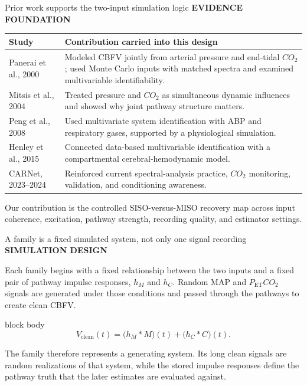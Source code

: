 \documentclass[aspectratio=169,11pt]{beamer}
\newcommand{\PETCOtwo}{P_{\mathrm{ET}}CO_2}
\newcommand{\sectionlabel}[1]{%
  {\color{Accent}\fontsize{8}{9.5}\selectfont\bfseries\MakeUppercase{#1}}\par\vspace{0.12cm}}
\newenvironment{equationcallout}
  {\begin{beamercolorbox}[rounded=true,sep=0.28cm,center,wd=0.94\textwidth]{block body}%
   \setbeamercolor{block body}{bg=AccentLight,fg=Ink}\large}
  {\end{beamercolorbox}}
\begin{document}
\begin{frame}{Prior work supports the two-input simulation logic}
\sectionlabel{Evidence Foundation}
\fontsize{9.4}{11.7}\selectfont
\begin{tabular}{p{}p{}}
\toprule
\textbf{Study} & \textbf{Contribution carried into this design}\\
\midrule
Panerai et al., 2000 & Modeled CBFV jointly from arterial pressure and end-tidal $CO_2$; used Monte Carlo inputs with matched spectra and examined multivariable identifiability.\\[0.08cm]
Mitsis et al., 2004 & Treated pressure and $CO_2$ as simultaneous dynamic influences and showed why joint pathway structure matters.\\[0.08cm]
Peng et al., 2008 & Used multivariate system identification with ABP and respiratory gases, supported by a physiological simulation.\\[0.08cm]
Henley et al., 2015 & Connected data-based multivariable identification with a compartmental cerebral-hemodynamic model.\\[0.08cm]
CARNet, 2023--2024 & Reinforced current spectral-analysis practice, $CO_2$ monitoring, validation, and conditioning awareness.\\
\bottomrule
\end{tabular}

\vspace{0.15cm}
Our contribution is the controlled SISO-versus-MISO recovery map across input
coherence, excitation, pathway strength, recording quality, and estimator settings.
\end{frame}

\begin{frame}{A family is a fixed simulated system, not only one signal recording}
\sectionlabel{Simulation Design}
Each family begins with a fixed relationship between the two inputs and a fixed
pair of pathway impulse responses, $h_M$ and $h_C$. Random MAP and $\PETCOtwo$
signals are generated under those conditions and passed through the pathways to
create clean CBFV.

\vspace{0.28cm}
\begin{equationcallout}
\[
V_{\mathrm{clean}}(t)
=\bigl(h_M*M\bigr)(t)+\bigl(h_C*C\bigr)(t).
\]
\end{equationcallout}

\vspace{0.22cm}
The family therefore represents a generating system. Its long clean signals are
random realizations of that system, while the stored impulse responses define
the pathway truth that the later estimates are evaluated against.
\end{frame}
\end{document}
